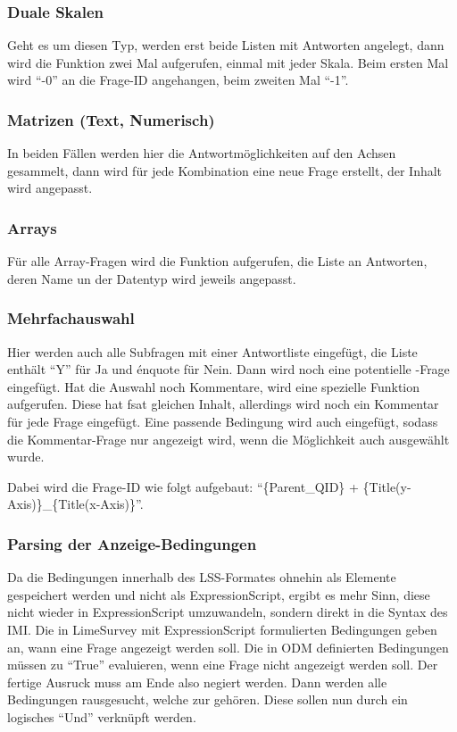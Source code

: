 \subsubsection{Duale Skalen}

Geht es um diesen Typ, werden erst beide Listen mit Antworten angelegt, dann wird die Funktion  zwei Mal aufgerufen, einmal mit jeder Skala.
Beim ersten Mal wird \enquote{-0} an die Frage-ID angehangen, beim zweiten Mal \enquote{-1}.

\subsubsection{Matrizen (Text, Numerisch)}

In beiden Fällen werden hier die Antwortmöglichkeiten auf den Achsen gesammelt, dann wird für jede Kombination eine neue Frage erstellt, der Inhalt wird angepasst.

\subsubsection{Arrays}

Für alle Array-Fragen wird die Funktion  aufgerufen, die Liste an Antworten, deren Name un der Datentyp wird jeweils angepasst.

\subsubsection{Mehrfachauswahl}

Hier werden auch alle Subfragen mit einer Antwortliste eingefügt, die Liste enthält \enquote{Y} für Ja und énquote{} für Nein.
Dann wird noch eine potentielle -Frage eingefügt.
Hat die Auswahl noch Kommentare, wird eine spezielle Funktion aufgerufen.
Diese hat fsat gleichen Inhalt, allerdings wird noch ein Kommentar für jede Frage eingefügt.
Eine passende Bedingung wird auch eingefügt, sodass die Kommentar-Frage nur angezeigt wird, wenn die Möglichkeit auch ausgewählt wurde.

Dabei wird die Frage-ID wie folgt aufgebaut: \enquote{\{Parent\_QID\} + \{Title(y-Axis)\}\_\{Title(x-Axis)\}}.

\subsubsection{Parsing der Anzeige-Bedingungen}
\label{im:cond}

Da die Bedingungen innerhalb des LSS-Formates ohnehin als Elemente gespeichert werden und nicht als ExpressionScript, ergibt es mehr Sinn, diese nicht wieder in ExpressionScript umzuwandeln, sondern direkt in die Syntax des IMI.
Die in LimeSurvey mit ExpressionScript formulierten Bedingungen geben an, wann eine Frage angezeigt werden soll.
Die in ODM definierten Bedingungen müssen zu \enquote{True} evaluieren, wenn eine Frage nicht angezeigt werden soll.
Der fertige Ausruck muss am Ende also negiert werden.
Dann werden alle Bedingungen rausgesucht, welche zur  gehören.
Diese sollen nun durch ein logisches \enquote{Und} verknüpft werden.

